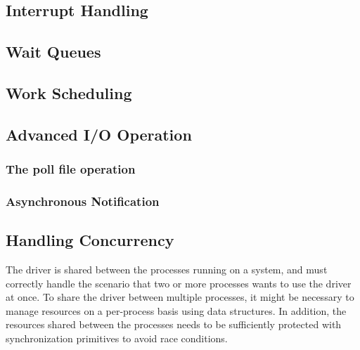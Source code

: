 \subsection{Interrupt Handling}\label{sec:interrupt-handling}

\subsection{Wait Queues}\label{sec:wait-queues}


\subsection{Work Scheduling}\label{sec:work-scheduling}


\subsection{Advanced I/O Operation}
\subsubsection{The poll file operation}\label{sec:the-poll-file-operation}
\subsubsection{Asynchronous Notification}\label{sec:asynchronous-notification}



\subsection{Handling Concurrency}\label{sec:handling-concurrency}
The driver is shared between the processes running on a system, and must correctly handle the scenario that two or more processes wants to use the driver at once. To share the driver between multiple processes, it might be necessary to manage resources on a per-process basis using data structures. In addition, the resources shared between the processes needs to be sufficiently protected with synchronization primitives to avoid race conditions.

